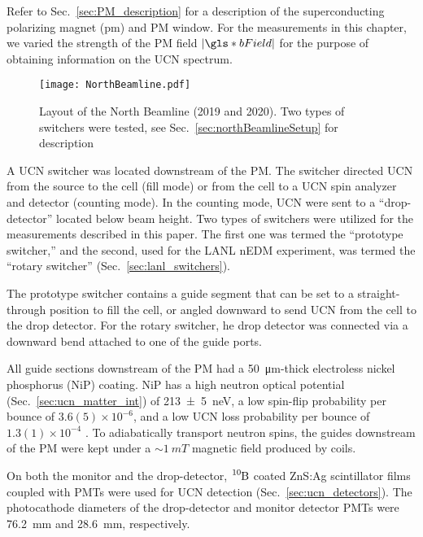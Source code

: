 Refer to Sec.~\ref{sec:PM_description} for a description of the superconducting polarizing magnet (\acrshort*{pm}) and PM window. For the measurements in this chapter, we varied the strength of the PM field $ |\gls*{bField} |$ for the purpose of obtaining information on the UCN spectrum.



\begin{figure}[htp]
    \centering
    \texttt{[image: NorthBeamline.pdf]}
    \caption[Layout of the North Beamline (2019 and 2020).]{Layout of the North Beamline (2019 and 2020). Two types of switchers were tested, see Sec.~\ref{sec:northBeamlineSetup} for description}
    \label{fig:NorthBeamlineLayout}
\end{figure}

A UCN switcher was located downstream of the PM. The switcher directed UCN from the source to the cell (fill mode) or from the cell to a UCN spin analyzer and detector (counting mode). In the counting mode, UCN were sent to a ``drop-detector'' located below beam height. Two types of switchers were utilized for the measurements described in this paper. The first one was termed the ``prototype switcher,'' and the second, used for the LANL nEDM experiment, was termed the ``rotary switcher'' (Sec.~\ref{sec:lanl_switchers}).

The prototype switcher contains a guide segment that can be set to a straight-through position to fill the cell, or angled downward to send UCN from the cell to the drop detector. For the rotary switcher, he drop detector was connected via a downward bend attached to one of the guide ports. 

All guide sections downstream of the PM had a \qty{50}{\micro\meter}-thick electroless nickel phosphorus (NiP) coating. NiP has a high neutron optical potential (Sec.~\ref{sec:ucn_matter_int}) of \qty{213(5)}{\nano\eV}, a low spin-flip probability per bounce of $3.6(5) \times 10^{-6}$, and a low UCN loss probability per bounce of $1.3(1) \times 10^{-4}$ \cite{tang_measurement_2016, pattie_jr_evaluation_2017}. To adiabatically transport neutron spins, the guides downstream of the PM were kept under a $\sim\qty{1}{mT}$ magnetic field produced by coils.

On both the monitor and the drop-detector, $\ce{^{10}B}$ coated ZnS:Ag scintillator films coupled with PMTs were used for UCN detection (Sec.~\ref{sec:ucn_detectors}). The photocathode diameters of the drop-detector and monitor detector PMTs were \qty{76.2}{\mm} and \qty{28.6}{\mm}, respectively.

